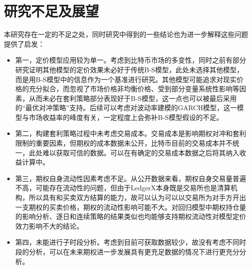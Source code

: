 \section{研究不足及展望} 
本研究存在一定的不足之处，同时研究中得到的一些结论也为进一步解释这些问题提供了启发：
\begin{itemize}
    \item 第一，定价模型应用较为单一。考虑到比特币市场的多变性，同时之前有部分研究证明其他模型的定价效果未必好于传统B-S模型，此处未选择其他模型，而是用B-S模型中的信息作为一个基准进行研究。其他模型可能追求对现实价格的充分拟合，而忽视了市场价格非均衡价格、受到部分变量系统性影响等因素，从而未必在套利策略部分表现好于B-S模型，这一点也可以被最后采用的“最优对冲策略”支持。后续可以考虑对波动率建模的GARCH模型，这一模型与市场收益率的峰度有关，一定程度上会弥补B-S模型假设的不足。
    \item 第二，构建套利策略过程中未考虑交易成本。交易成本是影响期权对冲和套利限制的重要因素，但期权的成本数据未公开，比特币目前的交易成本并不统一，此处难以获取可信的数据。可以在有确定的交易成本数据之后将其纳入收益计算中。
    \item 第三，期权自身流动性因素考虑不足。从公开数据来看，期权自身交易量普遍不高，可能存在流动性的问题，但由于LedgerX本身既是交易所也是清算机构，所以具有和买卖双方结算的能力，故可以认为可以以交易所为对手方开出一支期权的买卖价格，期权的流动性影响可能不大。对回归模型中期权持仓量的影响分析、逐日和连续策略的结果类似也均能够支持期权流动性对模型定价效力影响不大的结论。
    \item 第四，未能进行子时段分析。考虑到目前可获取数据较少，故没有考虑不同时段的分析，可以在未来期权进一步发展具有更充足数据的情况下进行更充分分析。
\end{itemize}